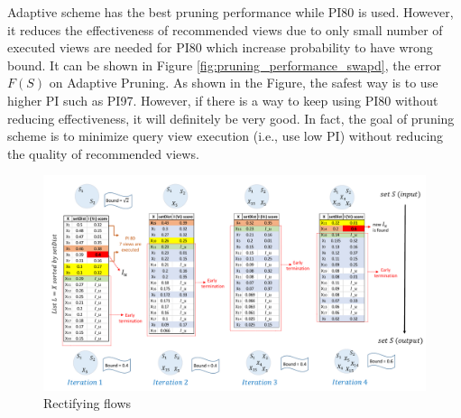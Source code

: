 \documentclass{article}
\begin{document}
%
%		
%
%
%
%		



Adaptive scheme has the best pruning performance while PI80 is used. However, it reduces the effectiveness of recommended views due to only small number of executed views are needed for PI80 which increase probability to have wrong bound. It can be shown in Figure \ref{fig:pruning_performance_swapd}, the error $F(S)$ on Adaptive Pruning. As shown in the Figure, the safest way is to use higher PI such as PI97. However, if there is a way to keep using PI80 without reducing effectiveness, it will definitely be very good. In fact, the goal of pruning scheme is to minimize query view execution (i.e., use low PI) without reducing the quality of recommended views. 
\begin{figure}
	\begin{center}
		\includegraphics[width=5.0in]{figures/Rectifying_flow_column}
		\caption{Rectifying flows}
		\label{fig:Rectifying_flow_column}
	\end{center}
\end{figure}
\end{document}
